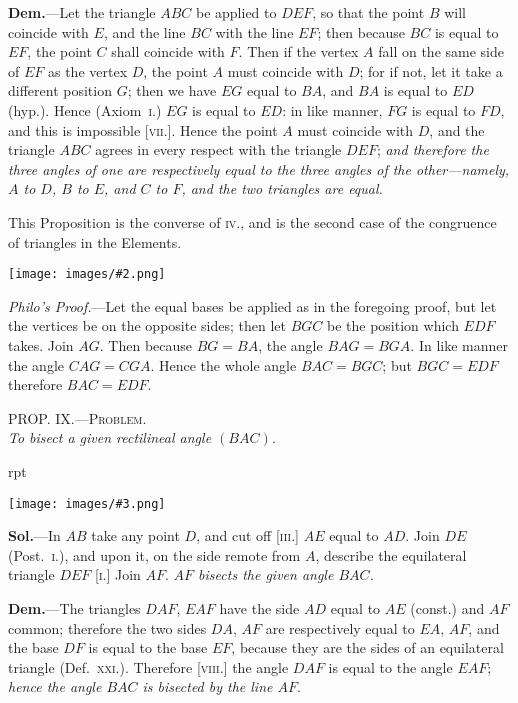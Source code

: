\documentclass[oneside]{book}
\newcounter{wrapwidth}
\newcommand\myprop[2]{
\bigskip\Needspace*{4\baselineskip}\begin{center}\textsc{#1}\\\medskip\emph{#2}\par\end{center}
}
\newcommand\imgflow[3]{
\setcounter{wrapwidth}{#1}
\begin{wrapfigure}[#2]{r}{\value{wrapwidth}pt}
\begin{center}
\vspace{-0.3in}
\texttt{[image: images/\#3.png]}
\end{center}
\end{wrapfigure}
}
\newcommand\imgcent[2]{
\begin{center}
\texttt{[image: images/\#2.png]}
\end{center}
}
\begin{document}
\textbf{Dem.}---Let the triangle $ABC$ be applied to $DEF$,
so that the point $B$ will coincide with $E$, and the
line $BC$ with the line $EF$; then because $BC$ is equal
to $EF$, the point $C$ shall coincide with $F$. Then if the
vertex $A$ fall on the same side of $EF$ as the vertex $D$,
the point $A$ must coincide
with $D$; for if not,
let it take a different
position $G$; then we have
$EG$ equal to $BA$, and $BA$
is equal to $ED$ (hyp.).
Hence (Axiom~\textsc{i.}) $EG$ is
equal to $ED$: in like
manner, $FG$ is equal to $FD$, and this is impossible [\textsc{vii.}].
Hence the point $A$ must coincide with $D$, and the
triangle $ABC$ agrees in every respect with the triangle
$DEF$; \emph{and therefore the three angles of one are respectively
equal to the three angles of the other---namely, $A$ to
$D$, $B$ to $E$, and $C$ to $F$, and the two triangles are equal.}

This Proposition is the converse of \textsc{iv.}, and is the
second case of the congruence of triangles in the
Elements.

\imgcent{177}{f023}

\begin{footnotesize}
\emph{Philo's Proof.}---Let the equal bases be applied as in the foregoing
proof, but let the vertices be on the opposite sides; then let
$BGC$ be the position which $EDF$ takes. Join $AG$. Then because
$BG = BA$, the angle $BAG = BGA$. In like manner the angle $CAG
= CGA$. Hence the whole angle $BAC = BGC$; but $BGC = EDF$
therefore $BAC = EDF$.
\par\end{footnotesize}


\myprop{PROP\@. IX\@.---Problem.}{To bisect a given rectilineal angle $(BAC)$.}

\imgflow{120}{13}{f024}

\textbf{Sol.}---In $AB$ take any point $D$, and cut off [\textsc{iii.}] $AE$
equal to $AD$. Join $DE$ (Post.~\textsc{i.}),
and upon it, on the side remote
from $A$, describe the equilateral
triangle $DEF$ [\textsc{i.}] Join
$AF$. \emph{$AF$ bisects the given angle
$BAC$.}

\textbf{Dem.}---The triangles $DAF$,
$EAF$ have the side $AD$ equal
to $AE$ (const.) and $AF$ common;
therefore the two sides $DA$, $AF$
are respectively equal to $EA$,
$AF$, and the base $DF$ is equal to
the base $EF$, because they are the sides of an equilateral
triangle (Def.~\textsc{xxi.}). Therefore [\textsc{viii.}] the
angle $DAF$ is equal to the angle $EAF$; \emph{hence the angle
$BAC$ is bisected by the line $AF$}.
\end{document}
